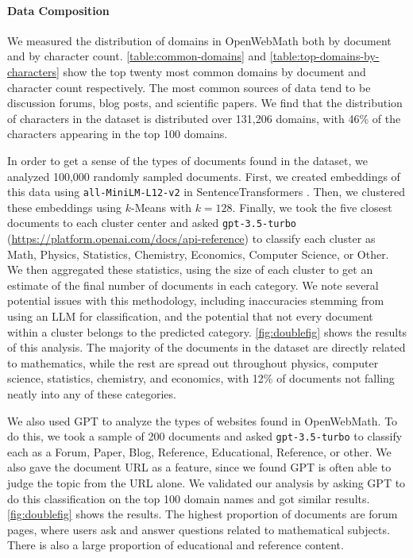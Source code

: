 \paragraph{Data Composition} We measured the distribution of domains in OpenWebMath both by document and by character count. \autoref{table:common-domains} and \autoref{table:top-domains-by-characters} show the top twenty most common domains by document and character count respectively. The most common sources of data tend to be discussion forums, blog posts, and scientific papers. We find that the distribution of characters in the dataset is distributed over 131,206 domains, with 46\% of the characters appearing in the top 100 domains.

In order to get a sense of the types of documents found in the dataset, we analyzed 100,000 randomly sampled documents. First, we created embeddings of this data using \texttt{all-MiniLM-L12-v2} \citep{wang2020minilm} in SentenceTransformers \citep{reimers-2019-sentence-bert}. Then, we clustered these embeddings using $k$-Means with $k=128$. Finally, we took the five closest documents to each cluster center and asked \texttt{gpt-3.5-turbo} (\href{https://platform.openai.com/docs/api-reference}{https://platform.openai.com/docs/api-reference}) to classify each cluster as Math, Physics, Statistics, Chemistry, Economics, Computer Science, or Other. We then aggregated these statistics, using the size of each cluster to get an estimate of the final number of documents in each category. We note several potential issues with this methodology, including inaccuracies stemming from using an LLM for classification, and the potential that not every document within a cluster belongs to the predicted category. \autoref{fig:doublefig} shows the results of this analysis. The majority of the documents in the dataset are directly related to mathematics, while the rest are spread out throughout physics, computer science, statistics, chemistry, and economics, with 12\% of documents not falling neatly into any of these categories.

We also used GPT to analyze the types of websites found in OpenWebMath. To do this, we took a sample of 200 documents and asked \texttt{gpt-3.5-turbo} to classify each as a Forum, Paper, Blog, Reference, Educational, Reference, or other. We also gave the document URL as a feature, since we found GPT is often able to judge the topic from the URL alone. We validated our analysis by asking GPT to do this classification on the top 100 domain names and got similar results. \autoref{fig:doublefig} shows the results. The highest proportion of documents are forum pages, where users ask and answer questions related to mathematical subjects. There is also a large proportion of educational and reference content.


